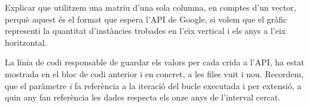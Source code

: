Explicar que utilitzem una matriu d'una sola columna, en comptes d'un vector, perquè aquest és el format que espera l'API de Google, si volem que el gràfic representi la quantitat d'instàncies trobades en l'eix vertical i els anys a l'eix horitzontal.

La línia de codi responsable de guardar els valors per cada crida a l’API, ha estat mostrada en el bloc de codi anterior i en concret, a les files vuit i nou. Recordem, que el paràmetre \emph{i} fa referència a la iteració del bucle executada i per extensió, a quin any fan referència les dades respecta els onze anys de l’interval cercat.
